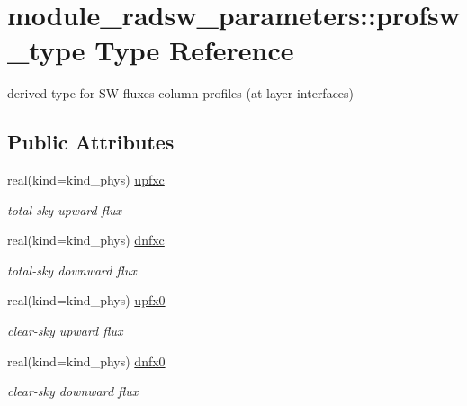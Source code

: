 \hypertarget{structmodule__radsw__parameters_1_1profsw__type}{}\section{module\+\_\+radsw\+\_\+parameters\+:\+:profsw\+\_\+type Type Reference}
\label{structmodule__radsw__parameters_1_1profsw__type}


derived type for SW fluxes\textquotesingle{} column profiles (at layer interfaces)  


\subsection*{Public Attributes}
\textbf{ }\par
\begin{DoxyCompactItemize}
\item 
\mbox{\label{structmodule__radsw__parameters_1_1profsw__type_a5122ef2eef4e86a7aadf77114da4b3e2}} 
real(kind=kind\+\_\+phys) \hyperlink{structmodule__radsw__parameters_1_1profsw__type_a5122ef2eef4e86a7aadf77114da4b3e2}{upfxc}
\begin{DoxyCompactList}\small\item\em total-\/sky upward flux \end{DoxyCompactList}\item 
\mbox{\label{structmodule__radsw__parameters_1_1profsw__type_a4d253ac17ae97351a0a3eb15ab4d55e4}} 
real(kind=kind\+\_\+phys) \hyperlink{structmodule__radsw__parameters_1_1profsw__type_a4d253ac17ae97351a0a3eb15ab4d55e4}{dnfxc}
\begin{DoxyCompactList}\small\item\em total-\/sky downward flux \end{DoxyCompactList}\item 
\mbox{\label{structmodule__radsw__parameters_1_1profsw__type_aa9205ed3a95d61dd8e4e7184fd6da43e}} 
real(kind=kind\+\_\+phys) \hyperlink{structmodule__radsw__parameters_1_1profsw__type_aa9205ed3a95d61dd8e4e7184fd6da43e}{upfx0}
\begin{DoxyCompactList}\small\item\em clear-\/sky upward flux \end{DoxyCompactList}\item 
\mbox{\label{structmodule__radsw__parameters_1_1profsw__type_aff3ff3155ed05a18fa7caba351d1c503}} 
real(kind=kind\+\_\+phys) \hyperlink{structmodule__radsw__parameters_1_1profsw__type_aff3ff3155ed05a18fa7caba351d1c503}{dnfx0}
\begin{DoxyCompactList}\small\item\em clear-\/sky downward flux \end{DoxyCompactList}\end{DoxyCompactItemize}



